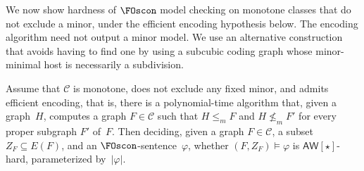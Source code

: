 \documentclass[1p,number,11pt]{elsarticle}
\theoremstyle{plain}
\newcommand{\Cc}{\mathscr{C}}
\renewcommand{\leq}{\leqslant}
\begin{document}
We now show hardness of $\FOscon$ model checking on monotone classes that do not exclude a minor, under the efficient encoding hypothesis below.
The encoding algorithm need not output a minor model.
We use an alternative construction that avoids having to find one by using a subcubic coding graph whose minor-minimal host is necessarily a subdivision.


\begin{theorem}[store=thm:main-hardness-new,
    restate-keys={note=see \zcpageref[nocap]{thm:main-hardness-new}}]
Assume that $\Cc$ is monotone, does not exclude any fixed minor, and admits
efficient encoding, that is, there is a polynomial-time algorithm that, given
a graph~$H$, computes a graph $F\in\Cc$ such that $H\leq_m F$ and
$H\not\leq_m F'$ for every proper subgraph $F'$ of~$F$.
Then deciding, given a graph $F\in\Cc$, a subset $Z_F\subseteq E(F)$, and an
$\FOscon$-sentence~$\varphi$, whether $(F,Z_F)\models\varphi$ is
$\mathsf{AW}[\star]$-hard, parameterized by~$|\varphi|$.
\end{theorem}
\end{document}
